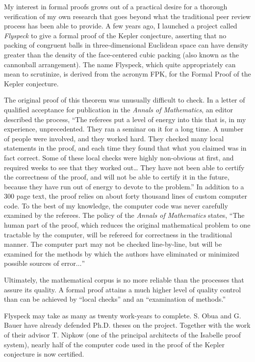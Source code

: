 \documentclass{llncs}
\begin{document}
My interest in formal proofs grows out of a practical desire for
a thorough verification of my own  research that goes beyond what
the traditional peer review process has been able to provide.
A few years ago, I launched a project called {\it Flyspeck} to
give a formal proof of the Kepler conjecture, asserting that
no packing of congruent balls in three-dimensional Euclidean space
can have density greater than the density of the face-centered cubic
packing (also known as the cannonball arrangement).  The name
Flyspeck, which quite appropriately can mean to scrutinize, is derived from the acronym FPK, for the Formal Proof of the Kepler
conjecture.  


The original proof of this theorem was unusually difficult
to check.  In a letter of qualified acceptance 
for  publication in the {\it Annals of Mathematics}, an editor described the process, ``The referees put a level of energy into this that is, in my experience, unprecedented. They ran a seminar on it for a long time. A number of people were involved, and they worked hard. They checked many local statements in the proof, and each time they found that what you claimed was in fact correct. Some of these local checks were highly non-obvious at first, and required weeks to see that they worked out\ldots
They have not been able to certify the correctness of the proof, 
and will not be able to certify it in the future, because they 
have run out of energy to devote to the problem.''  In addition to
a $300$ page text, the proof relies
on about forty thousand lines of custom computer code.  To the best of my knowledge,
the computer code was
never carefully examined by the referees.
The policy of the {\it Annals of Mathematics}
states, ``The human part of the proof, which reduces the original mathematical problem to one tractable by the computer, will be refereed for correctness in the traditional manner. The computer part may not be checked line-by-line, but will be examined for the methods by which the authors have eliminated or minimized possible sources of error$\ldots$''

Ultimately, the mathematical corpus is no more reliable than the processes
that assure its quality.  A formal proof attains a much
higher level of quality control than can be achieved by ``local checks''
and an ``examination of methods.''


Flyspeck may take as many as twenty work-years to complete. S. Obua and G. Bauer have already defended Ph.D. theses 
on the  project.  
Together with the work of
their advisor T. Nipkow (one of the principal architects of the Isabelle proof system), nearly half of the computer code
used in the proof of the Kepler conjecture is now 
certified.
\end{document}
